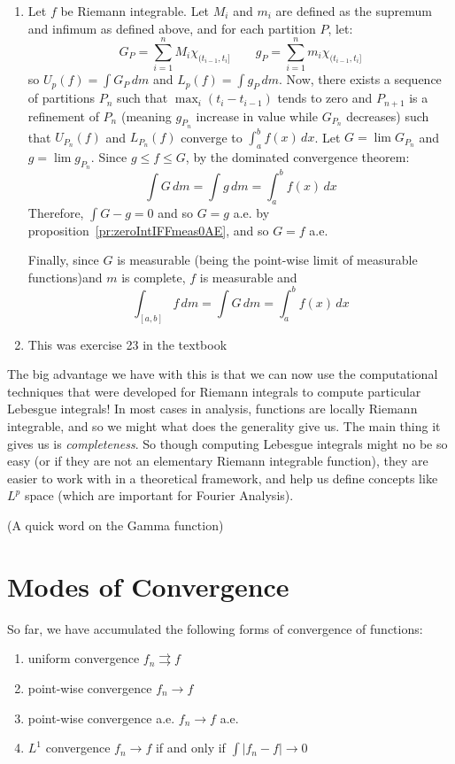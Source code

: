 \documentclass[oneside]{book}
\newcommand{\rw}{\rightarrow}
\newcommand{\rrw}{\rightrightarrows}
\begin{document}
\begin{Proof}
	\begin{enumerate}
		\item Let $f$ be Riemann integrable. Let $M_i$ and $m_i$ are defined as the supremum and infimum as defined
			above, and for each partition $P$, let:
			\[
				G_P = \sum_{i=1}^n M_i\chi_{(t_{i-1}, t_i]} \qquad g_P = \sum_{i=1}^n m_i\chi_{(t_{i-1}, t_i]}
			\]
			so $U_p(f) = \int G_P\,dm$ and $L_p(f) = \int g_P\,dm$. Now, there exists a sequence of partitions $P_n$
			such that $\max_i (t_i - t_{i-1})$ tends to zero and $P_{n+1}$ is a refinement of $P_n$ (meaning $g_{P_n}$
			increase in value while $G_{P_n}$ decreases) such that $U_{P_n}(f)$ and $L_{P_n}(f)$ converge to
			$\int_a^bf(x)\,dx$. Let $G = \lim G_{P_n}$ and $g = \lim g_{P_n}$. Since $g \le f \le G$, by the dominated
			convergence theorem:
			\[
				\int G\,dm = \int g\,dm = \int_a^b f(x)\,dx
			\]
			Therefore, $\int G - g = 0$ and so $G = g$ a.e. by proposition~\ref{pr:zeroIntIFFmeas0AE}, and so $G = f$
			a.e.

			Finally, since $G$ is measurable (being the point-wise limit of measurable functions)and $m$ is complete,
			$f$ is measurable and 
			\[
				\int_[a,b] f\,dm = \int G\,dm = \int_a^b f(x)\,dx
			\]
		\item This was exercise 23 in the textbook
	\end{enumerate}
\end{Proof}

The big advantage we have with this is that we can now use the computational techniques that were developed for Riemann
integrals to compute particular Lebesgue integrals! In most cases in analysis, functions are locally Riemann integrable,
and so we might what does the generality give us. The main thing it gives us is \emph{completeness}. So though computing
Lebesgue integrals might no be so easy (or if they are not an elementary Riemann integrable function), they are easier
to work with in a theoretical framework, and help us define concepts like $L^p$ space (which are important for Fourier
Analysis). 

(A quick word on the Gamma function)

\section{Modes of Convergence}

So far, we have accumulated the following forms of convergence of functions: 
\begin{enumerate}
	\item uniform convergence $f_n \rrw f$
	\item point-wise convergence $f_n \rw f$
	\item point-wise convergence a.e. $f_n \rw f$ a.e.
	\item $L^1$ convergence $f_n \rw f$  if and only if $\int |f_n-f| \rw 0$
\end{enumerate}
\end{document}
